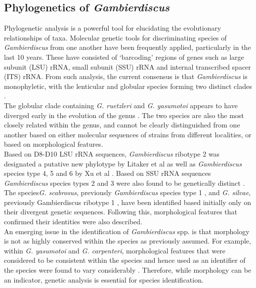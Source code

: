 \documentclass[12pt]{article}
\begin{document}
\subsection{Phylogenetics of \emph{Gambierdiscus}}

Phylogenetic analysis is a powerful tool for elucidating the evolutionary relationships of taxa. Molecular genetic tools for discriminating species of \emph{Gambierdiscus} from one another have been frequently applied, particularly in the last 10 years. These have consisted of ‘barcoding’ regions of genes such as large subunit (LSU) rRNA, small subunit (SSU) rRNA and internal transcribed spacer (ITS) rRNA. From such analysis, the current consensus is that \emph{Gambierdiscus} is monophyletic, with the lenticular and globular species forming two distinct clades \cite{chinain1999morphology,litaker2009taxonomy,fraga2011gambierdiscus,richlen2008phylogeography,kuno2010genetic,litaker2010global,nishimura2013genetic}. \\

The globular clade containing \emph{G. ruetzleri} and \emph{G. yasumotoi} appears to have diverged early in the evolution of the genus \cite{litaker2009taxonomy,nishimura2013genetic}. The two species are also the most closely related within the genus, and cannot be clearly distinguished from one another based on either molecular sequences of strains from different localities, or based on morphological features. \\

Based on D8-D10 LSU rRNA sequences, \emph{Gambierdiscus} ribotype 2 was designated a putative new phylotype by Litaker et al \cite{litaker2010global} as well as \emph{Gambierdiscus} species type 4, 5 and 6 by Xu et al \cite{xu2014distribution}. Based on SSU rRNA sequences \emph{Gambierdiscus} species types 2 and 3 were also found to be genetically distinct \cite{nishimura2013genetic,kuno2010genetic}. The species\emph{G. scabrosus}, previously \emph{Gambierdiscus} species type 1 \cite{nishimura2013genetic,nishimura2014morphology},  and \emph{G. silvae}, previously Gambierdiscus ribotype 1 \cite{fraga2014genus}, have been identified based initially only on their divergent genetic sequences. Following this, morphological features that confirmed their identities were also described. \\

An emerging issue in the identification of \emph{Gambierdiscus} spp. is that morphology is not as highly conserved within the species as previously assumed. For example, within \emph{G. yasumotoi} and \emph{G. carpenteri}, morphological features that were considered to be consistent within the species and hence used as an identifier of the species were found to vary considerably \cite{murray2014molecular,kohli2014high}. Therefore, while morphology can be an indicator, genetic analysis is essential for species identification.
\end{document}

